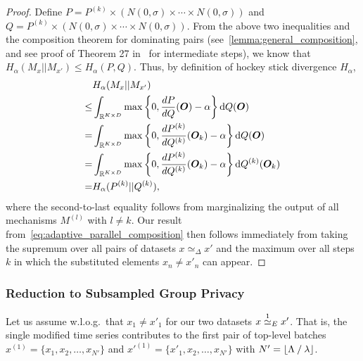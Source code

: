\begin{proof}
    Define $P = P^{(k)} \times \left( N(0,\sigma) \times \cdots \times N(0,\sigma)\right)$
    and $Q = P^{(k)} \times \left( N(0,\sigma) \times \cdots \times N(0,\sigma)\right)$.
    From the above two inequalities and 
     the composition theorem for dominating pairs (see~\cref{lemma:general_composition}, and see proof of Theorem 27 in~\cite{zhu2022optimal} for intermediate steps),
    we know that $H_\alpha(M_x || M_{x'}) \leq H_\alpha(P,Q)$. Thus, by definition of hockey stick divergence $H_\alpha$, 
    \begin{align*}
        &H_\alpha(M_x || M_{x'})
        \\
        \leq
        &
        \int_{{\mathbb{R}}^{K \times D}}
        \max
        \left\{
            0, \frac{d P}{d Q}({\bm{O}})
            - \alpha
        \right\}
        \mathrm{d}
        Q({\bm{O}})
        \\
        =
        &
        \int_{{\mathbb{R}}^{K \times D}}
        \max
        \left\{
            0, \frac{d P^{(k)}}{d Q^{(k)}}({\bm{O}}_k)
            - \alpha
        \right\}
        \mathrm{d}
        Q({\bm{O}})
        \\
        =
        &
        \int_{{\mathbb{R}}^{K \times D}}
        \max
        \left\{
            0, \frac{d P^{(k)}}{d Q^{(k)}}({\bm{O}}_k)
            - \alpha
        \right\}
        \mathrm{d}
        Q^{(k)}({\bm{O}}_k)
        \\
        = 
        &
        H_\alpha(P^{(k)} || Q^{(k)}),
    \end{align*}
    where the second-to-last equality follows from marginalizing the output of all mechanisms $M^{(l)}$ with $l \neq k$.
    Our result from~\cref{eq:adaptive_parallel_composition} then follows immediately from taking the supremum over all pairs of datasets $x \simeq_\Delta x'$
    and the maximum over all steps $k$ in which the substituted elements $x_n \neq x'_n$ can appear.
\end{proof}

\subsubsection{Reduction to Subsampled Group Privacy}\label{appendix:proofs_bottom_step_to_group}
Let us assume w.l.o.g.\ that $x_1 \neq x'_1$ for our two datasets $x \overset{1}{\simeq}_{E} x'$.
That is,  the single modified time series contributes to the first pair of top-level batches
$x^{(1)} = \{x_1,x_2,\dots,x_{N'}\}$ and $x'^{(1)} = \{x'_1,x_2,\dots,x_{N'}\}$
with $N' = \lfloor \Lambda \mathbin{/} \lambda \rfloor$.

